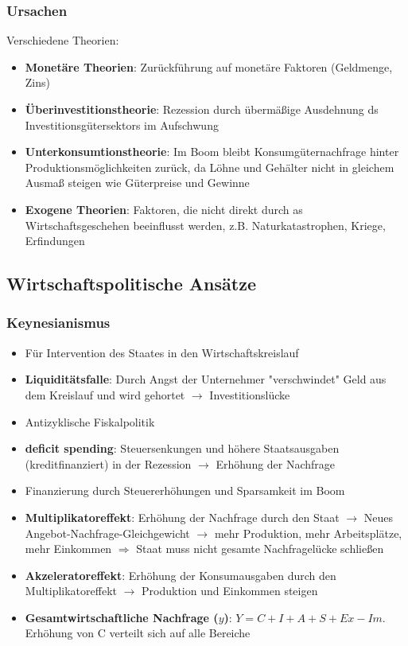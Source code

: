 \documentclass[titlepage,parskip=half]{scrartcl}
\begin{document}
\subsubsection{Ursachen}
Verschiedene Theorien:
\begin{itemize}
    \item \textbf{Monetäre Theorien}: Zurückführung auf monetäre Faktoren (Geldmenge, Zins)
    \item \textbf{Überinvestitionstheorie}: Rezession durch übermäßige Ausdehnung ds Investitionsgütersektors im Aufschwung
    \item \textbf{Unterkonsumtionstheorie}: Im Boom bleibt Konsumgüternachfrage hinter Produktionsmöglichkeiten zurück, da Löhne und Gehälter nicht in gleichem Ausmaß steigen wie Güterpreise und Gewinne
    \item \textbf{Exogene Theorien}: Faktoren, die nicht direkt durch as Wirtschaftsgeschehen beeinflusst werden, z.B. Naturkatastrophen, Kriege, Erfindungen
\end{itemize}

\subsection{Wirtschaftspolitische Ansätze}
\subsubsection{Keynesianismus}
\begin{itemize}
    \item Für Intervention des Staates in den Wirtschaftskreislauf
    \item \textbf{Liquiditätsfalle}: Durch Angst der Unternehmer "verschwindet" Geld aus dem Kreislauf und wird gehortet $\rightarrow$ Investitionslücke
    \item Antizyklische Fiskalpolitik
    \item \textbf{deficit spending}: Steuersenkungen und höhere Staatsausgaben (kreditfinanziert) in der Rezession $\rightarrow$ Erhöhung der Nachfrage
    \item Finanzierung durch Steuererhöhungen und Sparsamkeit im Boom
    \item \textbf{Multiplikatoreffekt}: Erhöhung der Nachfrage durch den Staat $\rightarrow$ Neues Angebot-Nachfrage-Gleichgewicht $\rightarrow$ mehr Produktion, mehr Arbeitsplätze, mehr Einkommen $\Rightarrow$ Staat muss nicht gesamte Nachfragelücke schließen
    \item \textbf{Akzeleratoreffekt}: Erhöhung der Konsumausgaben durch den Multiplikatoreffekt $\rightarrow$ Produktion und Einkommen steigen
    \item \textbf{Gesamtwirtschaftliche Nachfrage ($y$)}: $Y = C + I + A + S + Ex - Im$. Erhöhung von C verteilt sich auf alle Bereiche

\end{itemize}
\end{document}
